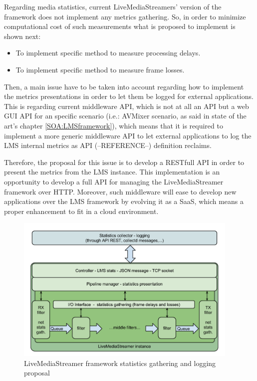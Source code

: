 Regarding media statistics, current LiveMediaStreamers' version of the framework does not implement any metrics gathering. So, in order to minimize computational cost of such measurements what is proposed to implement is shown next:

\begin{itemize}
\item To implement specific method to measure processing delays.
\item To implement specific method to measure frame losses.
\end{itemize}

Then, a main issue have to be taken into account regarding how to implement the metrics presentations in order to let them be logged for external applications. This is regarding current middleware API, which is not at all an API but a web GUI API for an specific scenario (i.e.: AVMixer scenario, as said in state of the art's chapter \ref{SOA:LMSframework}), which means that it is required to implement a more generic middleware API to let external applications to log the LMS internal metrics as API (--REFERENCE--) definition reclaims. 

Therefore, the proposal for this issue is to develop a RESTfull API in order to present the metrics from the LMS instance. This implementation is an opportunity to develop a full API for managing the LiveMediaStreamer framework over HTTP.  Moreover, such middleware will ease to develop new applications over the LMS framework by evolving it as a SaaS, which means a proper enhancement to fit in a cloud environment. 

\begin{figure}[htb]
\begin{center}
\includegraphics[width=0.95\textwidth]{./images/appArch.png}
\caption{LiveMediaStreamer framework statistics gathering and logging proposal}
\label{F:appArch}
\end{center}
\end{figure}

